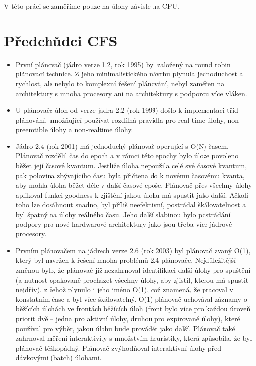 \documentclass[a4paper,12pt]{article}
\begin{document}
V této práci se zaměříme pouze na úlohy závisle na CPU.

\section{Předchůdci CFS}

\begin{itemize}

\item První plánovač (jádro verze 1.2, rok 1995) byl založený na round robin plánovací technice. Z jeho minimalistického návrhu plynula jednoduchost a rychlost, ale nebylo to komplexní řešení plánování, nebyl zaměřen na architektury s mnoha procesory ani na architektury s podporou více vláken.

\item U plánovače úloh od verze jádra 2.2 (rok 1999) došlo k implementaci tříd plánování, umožňující používat rozdílná pravidla pro real-time úlohy, non-preemtible úlohy a non-realtime úlohy.

\item Jádro 2.4 (rok 2001) má jednoduchý plánovač operující s O(N) časem. Plánovač rozdělil čas do epoch a v rámci této epochy bylo úloze povoleno běžet její časové kvantum. Jestliže úloha nepoužila celé své časové kvantum, pak polovina zbývajícího času byla přičtena do k novému časovému kvanta, aby mohla úloha běžet déle v další časové epoše. Plánovač přes všechny úlohy aplikoval funkci goodness k zjištění jakou úlohu má spustit jako další. Ačkoli toho lze dosáhnout snadno, byl příliš neefektivní, postrádal škálovatelnost a byl špatný na úlohy reálného času. Jeho další slabinou bylo postrádání podpory pro nové hardwarové architektury jako jsou třeba více jádrové procesory. 

\item Prvním plánovačem na jádrech verze 2.6 (rok 2003) byl plánovač zvaný O(1), který byl navržen k řešení mnoha problémů 2.4 plánovače. \linebreak Nejdůležitější změnou bylo, že plánovač již nezahrnoval identifikaci další úlohy pro spuštění (a nutnost opakovaně procházet všechny úlohy, aby zjistil, kterou má spustit nejdřív), z čehož plynulo i jeho jméno O(1), což znamená, že pracoval v konstatním čase a byl více škálovatelný. O(1) plánovač uchovával záznamy o běžících úlohách ve frontách běžících úloh (front bylo více pro každou úroveň priorit dvě – jedna pro aktivní úlohy, druhou pro expirované úlohy), které používal pro výběr, jakou úlohu bude provádět jako další. Plánovač také zahrnoval měření interaktivity s množstvím heuristiky, která způsobila, že byl plánovač těžkopádný. Plánovač zvýhodňoval interaktivní úlohy před dávkovými (batch) úlohami.

\end{itemize}
\end{document}
